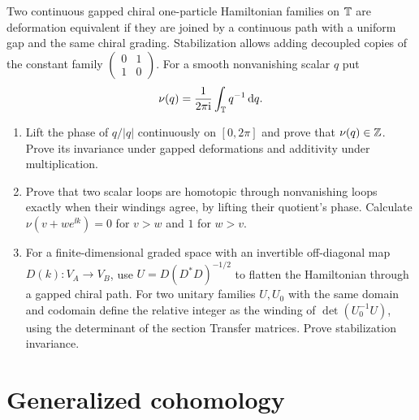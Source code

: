 \begin{exercise}
Two continuous gapped chiral one-particle Hamiltonian families on
$\mathbb T$ are deformation equivalent if they are joined by a continuous
path with a uniform gap and the same chiral grading. Stabilization
allows adding decoupled copies of the constant family
$\left(\begin{smallmatrix}0&1\\1&0\end{smallmatrix}\right)$.
For a smooth nonvanishing scalar $q$ put
\[
 \nu(q)=\frac1{2\pi\mathrm i}\int_{\mathbb T}q^{-1}\,\mathrm d q.
\]
\begin{enumerate}[label=(\alph*)]
\item Lift the phase of $q/|q|$ continuously on $[0,2\pi]$ and
prove that $\nu(q)\in\mathbb Z$. Prove its invariance under gapped
deformations and additivity under multiplication.
\item Prove that two scalar loops are homotopic through
nonvanishing loops exactly when their windings agree, by
lifting their quotient's phase. Calculate
$\nu(v+w e^{\ii k})=0$ for $v>w$ and $1$ for $w>v$.
\item For a finite-dimensional graded space with an invertible
off-diagonal map $D(k):V_A\to V_B$, use
$U=D(D^*D)^{-1/2}$ to flatten the Hamiltonian through a
gapped chiral path. For two unitary families $U,U_0$ with
the same domain and codomain define the relative integer
as the winding of $\det(U_0^{-1}U)$, using the determinant
of the section Transfer matrices. Prove stabilization invariance.
\end{enumerate}
\end{exercise}

\section{Generalized cohomology}

